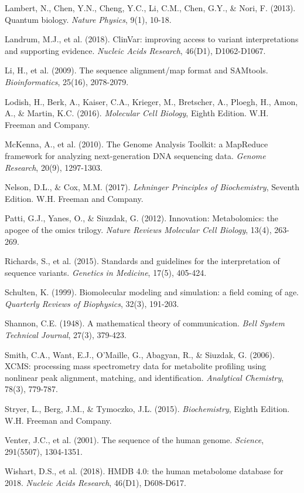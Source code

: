 \documentclass[12pt,a4paper]{article}
\begin{document}
\begin{thebibliography}{99}
Lambert, N., Chen, Y.N., Cheng, Y.C., Li, C.M., Chen, G.Y., \& Nori, F. (2013). Quantum biology. \textit{Nature Physics}, 9(1), 10-18.

Landrum, M.J., et al. (2018). ClinVar: improving access to variant interpretations and supporting evidence. \textit{Nucleic Acids Research}, 46(D1), D1062-D1067.

Li, H., et al. (2009). The sequence alignment/map format and SAMtools. \textit{Bioinformatics}, 25(16), 2078-2079.

Lodish, H., Berk, A., Kaiser, C.A., Krieger, M., Bretscher, A., Ploegh, H., Amon, A., \& Martin, K.C. (2016). \textit{Molecular Cell Biology}, Eighth Edition. W.H. Freeman and Company.

McKenna, A., et al. (2010). The Genome Analysis Toolkit: a MapReduce framework for analyzing next-generation DNA sequencing data. \textit{Genome Research}, 20(9), 1297-1303.

Nelson, D.L., \& Cox, M.M. (2017). \textit{Lehninger Principles of Biochemistry}, Seventh Edition. W.H. Freeman and Company.

Patti, G.J., Yanes, O., \& Siuzdak, G. (2012). Innovation: Metabolomics: the apogee of the omics trilogy. \textit{Nature Reviews Molecular Cell Biology}, 13(4), 263-269.

Richards, S., et al. (2015). Standards and guidelines for the interpretation of sequence variants. \textit{Genetics in Medicine}, 17(5), 405-424.

Schulten, K. (1999). Biomolecular modeling and simulation: a field coming of age. \textit{Quarterly Reviews of Biophysics}, 32(3), 191-203.

Shannon, C.E. (1948). A mathematical theory of communication. \textit{Bell System Technical Journal}, 27(3), 379-423.

Smith, C.A., Want, E.J., O'Maille, G., Abagyan, R., \& Siuzdak, G. (2006). XCMS: processing mass spectrometry data for metabolite profiling using nonlinear peak alignment, matching, and identification. \textit{Analytical Chemistry}, 78(3), 779-787.

Stryer, L., Berg, J.M., \& Tymoczko, J.L. (2015). \textit{Biochemistry}, Eighth Edition. W.H. Freeman and Company.

Venter, J.C., et al. (2001). The sequence of the human genome. \textit{Science}, 291(5507), 1304-1351.

Wishart, D.S., et al. (2018). HMDB 4.0: the human metabolome database for 2018. \textit{Nucleic Acids Research}, 46(D1), D608-D617.

\end{thebibliography}
\end{document}
